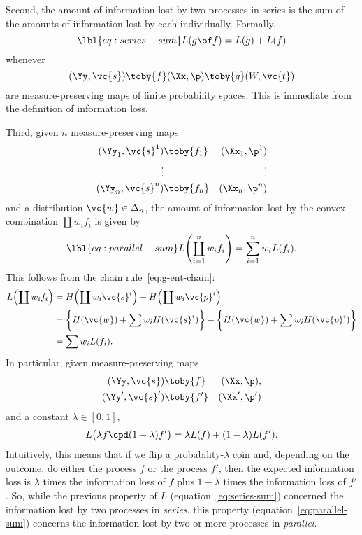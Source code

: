 Second, the amount of information lost by two processes%
%
%  
in series is the sum of the amounts of information lost by each
individually.  Formally,
% 
\begin{equation}
\lbl{eq:series-sum}
L(g \of f) = L(g) + L(f)
\end{equation}
% 
whenever
% 
\[
(\Yy, \vc{s}) \toby{f} (\Xx, \p) \toby{g} (W, \vc{t})
\]
% 
are measure-preserving maps of finite probability spaces.  This is
immediate from the definition of information loss.

Third, given $n$ measure-preserving maps
% 
\begin{eqnarray*}
(\Yy_1, \vc{s}^1) &\toby{f_1}& (\Xx_1, \p^1)   \\
\vdots& &\vdots \\
(\Yy_n, \vc{s}^n) &\toby{f_n}& (\Xx_n, \p^n)
\end{eqnarray*}
% 
and a distribution $\vc{w} \in \Delta_n$, the amount of information lost
by the convex combination $\coprod w_i f_i$ is given by
% 
\begin{equation}
\lbl{eq:parallel-sum}
L\Biggl( \coprod_{i = 1}^n w_i f_i \Biggr)
=
\sum_{i = 1}^n w_i L(f_i).
\end{equation}
% 
This follows from the chain rule~\eqref{eq:g-ent-chain}:
% 
\begin{align*}
L\Bigl( \coprod w_i f_i \Bigr)  &
=
H\Bigl( \coprod w_i \vc{s}^i \Bigr) 
- H\Bigl( \coprod w_i \vc{p}^i \Bigr)   \\
&
=
\biggl\{ H(\vc{w}) + \sum w_i H(\vc{s}^i) \biggr\}
-
\biggl\{ H(\vc{w}) + \sum w_i H(\vc{p}^i) \biggr\}        \\
&
=
\sum w_i L(f_i).
\end{align*}
% 
In particular, given measure-preserving maps
% 
\begin{eqnarray*}
(\Yy, \vc{s}) &\toby{f}& (\Xx, \p),   \\
(\Yy', \vc{s}') &\toby{f'}& (\Xx', \p')
\end{eqnarray*}
% 
and a constant $\lambda \in [0, 1]$,
\[
L\bigl( \lambda f \cpd (1 - \lambda) f' \bigr)
=
\lambda L(f) + (1 - \lambda) L(f').
\]
Intuitively, this means that if we flip a probability-$\lambda$ coin%
%
% 
and, depending on the outcome, do either the process $f$ or the process
$f'$, then the expected information loss is $\lambda$ times the information
loss of $f$ plus $1 - \lambda$ times the information loss of $f'$.  So,
while the previous property of $L$ (equation~\eqref{eq:series-sum})
concerned the information lost by two processes in \emph{series}, this
property (equation~\eqref{eq:parallel-sum}) concerns the information lost
by two or more processes in \emph{parallel}.

